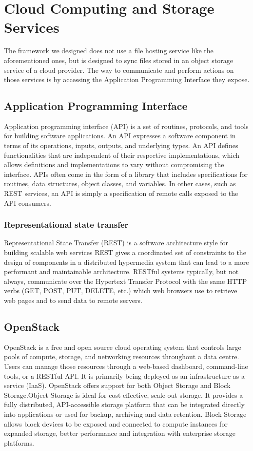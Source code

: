 \section{Cloud Computing and Storage Services}
  The framework we designed does not use a file hosting service like the aforementioned ones, but is designed to sync files stored in an object storage service of a cloud provider. The way to communicate and perform actions on those services is by accessing the Application Programming Interface they expose.

  \subsection{Application Programming Interface}
  Application programming interface (API) is a set of routines, protocols, and tools for building software applications. An API expresses a software component in terms of its operations, inputs, outputs, and underlying types. An API defines functionalities that are independent of their respective implementations, which allows definitions and implementations to vary without compromising the interface. APIs often come in the form of a library that includes specifications for routines, data structures, object classes, and variables. In other cases, such as REST services, an API is simply a specification of remote calls exposed to the API consumers.

  \subsubsection{Representational state transfer}
    Representational State Transfer (REST) is a software architecture style for building scalable web services\cite{fielding-taylor-2000} REST gives a coordinated set of constraints to the design of components in a distributed hypermedia system that can lead to a more performant and maintainable architecture\cite{fielding-2000}.
    RESTful systems typically, but not always, communicate over the Hypertext Transfer Protocol with the same HTTP verbs (GET, POST, PUT, DELETE, etc.) which web browsers use to retrieve web pages and to send data to remote servers.

  \subsection{OpenStack}
    OpenStack\cite{openstack} is a free and open source cloud operating system that controls large pools of compute, storage, and networking resources throughout a data centre. Users can manage those resources through a web-based dashboard, command-line tools, or a RESTful API. It is primarily being deployed as an infrastructure-as-a-service (IaaS). OpenStack offers support for both Object Storage and Block Storage.Object Storage is ideal for cost effective, scale-out storage. It provides a fully distributed, API-accessible storage platform that can be integrated directly into applications or used for backup, archiving and data retention. Block Storage allows block devices to be exposed and connected to compute instances for expanded storage, better performance and integration with enterprise storage platforms.

